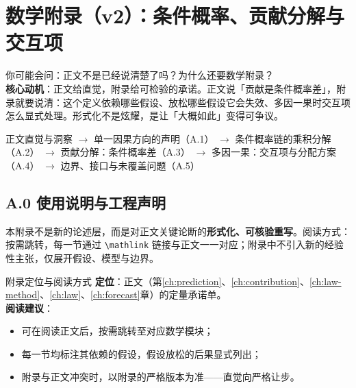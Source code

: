 \documentclass[../../main2.tex]{subfiles}
\begin{document}

	\chapter{数学附录（v2）：条件概率、贡献分解与交互项}
	\label{app:v2math}

	\begin{motivation}
		你可能会问：正文不是已经说清楚了吗？为什么还要数学附录？\\
		\textbf{核心动机}：正文给直觉，附录给可检验的承诺。正文说「贡献是条件概率差」，附录就要说清：这个定义依赖哪些假设、放松哪些假设它会失效、多因一果时交互项怎么显式处理。形式化不是炫耀，是让「大概如此」变得可争议。
	\end{motivation}

	\begin{logicmap}
	正文直觉与洞察
	$\rightarrow$ 单一因果方向的声明（A.1）
	$\rightarrow$ 条件概率链的乘积分解（A.2）
	$\rightarrow$ 贡献分解：条件概率差（A.3）
	$\rightarrow$ 多因一果：交互项与分配方案（A.4）
	$\rightarrow$ 边界、接口与未覆盖问题（A.5）
	\end{logicmap}

	\section{A.0 使用说明与工程声明}

	本附录不是新的论述层，而是对正文关键论断的\textbf{形式化、可核验重写}。阅读方式：按需跳转，每一节通过 \texttt{\textbackslash mathlink} 链接与正文一一对应；附录中不引入新的经验性主张，仅展开假设、模型与边界。

	\begin{mathbox}{附录定位与阅读方式}
		\textbf{定位}：正文（第\ref{ch:prediction}、\ref{ch:contribution}、\ref{ch:law-method}、\ref{ch:law}、\ref{ch:forecast}章）的定量承诺单。\\[0.4em]
		\textbf{阅读建议}：
		\begin{itemize}
			\item 可在阅读正文后，按需跳转至对应数学模块；
			\item 每一节均标注其依赖的假设，假设放松的后果显式列出；
			\item 附录与正文冲突时，以附录的严格版本为准——直觉向严格让步。
		\end{itemize}
	\end{mathbox}
\end{document}
